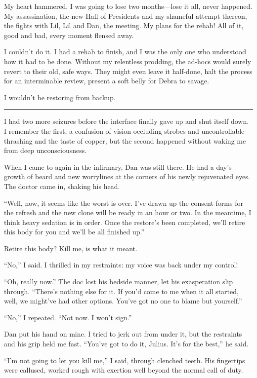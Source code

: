 My heart hammered. I was going to lose two months—lose it all,
never happened. My assassination, the new Hall of Presidents and my
shameful attempt thereon, the fights with Lil, Lil and Dan, the
meeting. My plans for the rehab! All of it, good and bad, every
moment flensed away.

I couldn't do it. I had a rehab to finish, and I was the only one
who understood how it had to be done. Without my relentless
prodding, the ad-hocs would surely revert to their old, safe ways.
They might even leave it half-done, halt the process for an
interminable review, present a soft belly for Debra to savage.

I wouldn't be restoring from backup.

\begin{center}\rule{3in}{0.4pt}\end{center}

I had two more seizures before the interface finally gave up and
shut itself down. I remember the first, a confusion of
vision-occluding strobes and uncontrollable thrashing and the taste
of copper, but the second happened without waking me from deep
unconsciousness.

When I came to again in the infirmary, Dan was still there. He had
a day's growth of beard and new worrylines at the corners of his
newly rejuvenated eyes. The doctor came in, shaking his head.

“Well, now, it seems like the worst is over. I've drawn up the
consent forms for the refresh and the new clone will be ready in an
hour or two. In the meantime, I think heavy sedation is in order.
Once the restore's been completed, we'll retire this body for you
and we'll be all finished up.”

Retire this body? Kill me, is what it meant.

“No,” I said. I thrilled in my restraints: my voice was back under
my control!

“Oh, really now.” The doc lost his bedside manner, let his
exasperation slip through. “There's nothing else for it. If you'd
come to me when it all started, well, we might've had other
options. You've got no one to blame but yourself.”

“No,” I repeated. “Not now. I won't sign.”

Dan put his hand on mine. I tried to jerk out from under it, but
the restraints and his grip held me fast. “You've got to do it,
Julius. It's for the best,” he said.

“I'm not going to let you kill me,” I said, through clenched teeth.
His fingertips were callused, worked rough with exertion well
beyond the normal call of duty.

